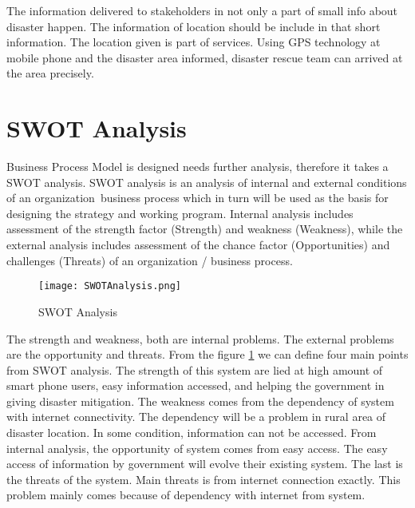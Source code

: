 The information delivered to stakeholders in not only a part of small info about disaster happen. The information of location should be include in that short information. The location given is part of services. Using GPS technology at mobile phone and the disaster area informed, disaster rescue team can arrived at the area precisely.\par 

\section{SWOT Analysis}
Business Process Model is designed needs further analysis, therefore it takes a SWOT analysis. SWOT analysis is an analysis of internal and external conditions of an organization\ business process which in turn will be used as the basis for designing the strategy and working program. Internal analysis includes assessment of the strength factor (Strength) and weakness (Weakness), while the external analysis includes assessment of the chance factor (Opportunities) and challenges (Threats) of an organization / business process\cite{ThesisKangTeguh}.\par 
\begin{figure}[h]
\centering
\texttt{[image: SWOTAnalysis.png]}
\caption{SWOT Analysis}
\label{fig:swot}
\end{figure}\par


The strength and weakness, both are internal problems. The external problems are the opportunity and threats. From the figure \ref{fig:swot} we can define four main points from SWOT analysis. The strength of this system are lied at high amount of smart phone users, easy information accessed, and helping the government in giving disaster mitigation. The weakness comes from the dependency of system with internet connectivity. The dependency will be a problem in rural area of disaster location. In some condition, information can not be accessed. From internal analysis, the opportunity of system comes from easy access. The easy access of information by government will evolve their existing system. The last is the threats of the system. Main threats is from internet connection exactly. This problem mainly comes because of dependency with internet from system.\par 

